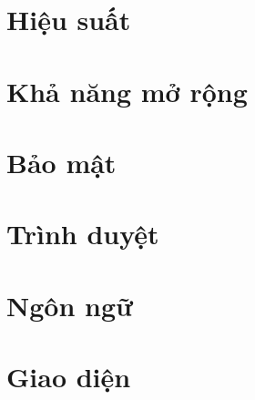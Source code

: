 \section{Hiệu suất}
\section{Khả năng mở rộng}
\section{Bảo mật}
\section{Trình duyệt}
\section{Ngôn ngữ}
\section{Giao diện}
